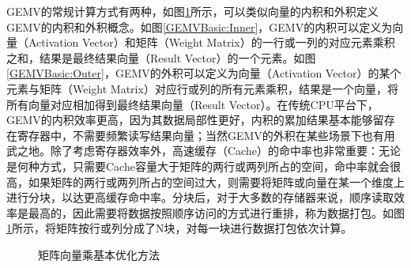 GEMV的常规计算方式有两种，如图\ref{GEMVBasic}所示，可以类似向量的内积和外积定义GEMV的内积和外积概念。如图\ref{GEMVBasic:Inner}，GEMV的内积可以定义为向量（Activation Vector）和矩阵（Weight Matrix）的一行或一列的对应元素乘积之和，结果是最终结果向量（Result Vector）的一个元素。如图\ref{GEMVBasic:Outer}，GEMV的外积可以定义为向量（Activation Vector）的某个元素与矩阵（Weight Matrix）对应行或列的所有元素乘积，结果是一个向量，将所有向量对应相加得到最终结果向量（Result Vector）。在传统CPU平台下，GEMV的内积效率更高，因为其数据局部性更好，内积的累加结果基本能够留存在寄存器中，不需要频繁读写结果向量；当然GEMV的外积在某些场景下也有用武之地。除了考虑寄存器效率外，高速缓存（Cache）的命中率也非常重要：无论是何种方式，只需要Cache容量大于矩阵的两行或两列所占的空间，命中率就会很高，如果矩阵的两行或两列所占的空间过大，则需要将矩阵或向量在某一个维度上进行分块，以达更高缓存命中率。分块后，对于大多数的存储器来说，顺序读取效率是最高的，因此需要将数据按照顺序访问的方式进行重排，称为数据打包。如图\ref{GEMVBasic}所示，将矩阵按行或列分成了N块，对每一块进行数据打包依次计算。

\begin{figure}[htbp!]
	\centering
	\caption{矩阵向量乘基本优化方法}
	\label{GEMVBasic}
\end{figure}

